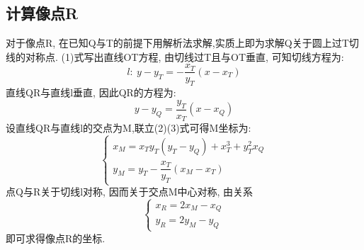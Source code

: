 \documentclass[12pt,a4paper,oneside]{article}
\begin{document}
\subsection{计算像点R}
对于像点R, 在已知Q与T的前提下用解析法求解,实质上即为求解Q关于圆上过T切线的对称点.
(1)式写出直线OT方程, 由切线过T且与OT垂直, 可知切线方程为:
\begin{equation}
    l:\ y-y_T = -\dfrac{x_T}{y_T}(x-x_T)
\end{equation}
直线QR与直线l垂直, 因此QR的方程为:
\begin{equation}
    y-y_Q = \dfrac{y_T}{x_T}(x-x_Q)
\end{equation}
设直线QR与直线l的交点为M,联立(2)(3)式可得M坐标为:
\begin{equation}
    \begin{cases}
        x_M = x_Ty_T(y_T-y_Q)+x_T^3+y_T^2x_Q\\
        y_M = y_T-\dfrac{x_T}{y_T}(x_M-x_T)
    \end{cases}
\end{equation}
点Q与R关于切线l对称, 因而关于交点M中心对称, 由关系
\begin{equation}
    \begin{cases}
        x_R = 2x_M-x_Q\\
        y_R = 2y_M-y_Q
    \end{cases}
\end{equation}
即可求得像点R的坐标.
\end{document}
